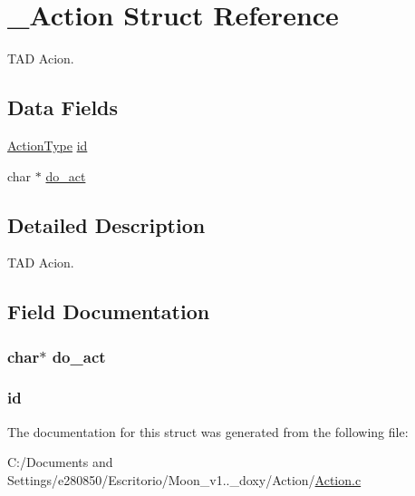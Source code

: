 \hypertarget{struct___action}{\section{\+\_\+\+Action Struct Reference}
\label{struct___action}
}


T\+A\+D Acion.  


\subsection*{Data Fields}
\begin{DoxyCompactItemize}
\item 
\hyperlink{_action_8h_a21d5e8f8cdaa838586b31007df0a950b}{Action\+Type} \hyperlink{struct___action_a91375186f3b4cf1499e19cb577e41640}{id}
\item 
char $\ast$ \hyperlink{struct___action_aa842ced41bdce7a8906b4b98d387a2e0}{do\+\_\+act}
\end{DoxyCompactItemize}


\subsection{Detailed Description}
T\+A\+D Acion. 


\begin{DoxyItemize}
\item 
\end{DoxyItemize}

\subsection{Field Documentation}
\hypertarget{struct___action_aa842ced41bdce7a8906b4b98d387a2e0}{
\subsubsection[{do\+\_\+act}]{\setlength{\rightskip}{0pt plus 5cm}char$\ast$ do\+\_\+act}}\label{struct___action_aa842ced41bdce7a8906b4b98d387a2e0}
\hypertarget{struct___action_a91375186f3b4cf1499e19cb577e41640}{
\subsubsection[{id}]{ id}}\label{struct___action_a91375186f3b4cf1499e19cb577e41640}


The documentation for this struct was generated from the following file\+:\begin{DoxyCompactItemize}
\item 
C\+:/\+Documents and Settings/e280850/\+Escritorio/\+Moon\+\_\+v1..\+\_\+doxy/\+Action/\hyperlink{_action_8c}{Action.\+c}\end{DoxyCompactItemize}
